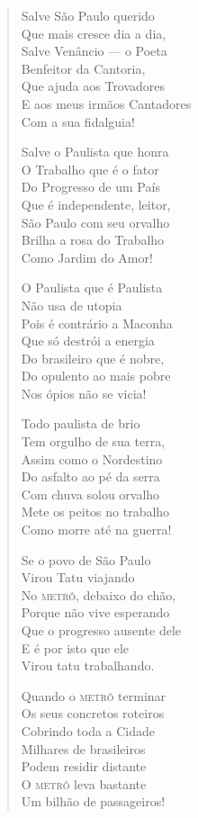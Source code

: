 \begin{verse}
Salve São Paulo querido \\
Que mais cresce dia a dia, \\
Salve Venâncio ---  o Poeta \\
Benfeitor da Cantoria, \\
Que ajuda aos Trovadores \\
E aos meus irmãos Cantadores \\
Com a sua fidalguia! 


Salve o Paulista que honra \\
O Trabalho que é o fator \\
Do Progresso de um País \\
Que é independente, leitor, \\
São Paulo com seu orvalho \\
Brilha a rosa do Trabalho \\
Como Jardim do Amor! 

O Paulista que é Paulista \\
Não usa de utopia \\
Pois é contrário a Maconha \\
Que só destrói a energia \\
Do brasileiro que é nobre, \\
Do opulento ao mais pobre \\
Nos ópios não se vicia! 

Todo paulista de brio \\
Tem orgulho de sua terra, \\
Assim como o Nordestino \\
Do asfalto ao pé da serra \\
Com chuva solou orvalho \\
Mete os peitos no trabalho \\
Como morre até na guerra! 

Se o povo de São Paulo \\
Virou Tatu viajando \\
No \textsc{metrô}, debaixo do chão, \\
Porque não vive esperando \\
Que o progresso ausente dele \\
E é por isto que ele \\
Virou tatu trabalhando. 


Quando o \textsc{metrô} terminar \\
Os seus concretos roteiros \\
Cobrindo toda a Cidade \\
Milhares de brasileiros \\
Podem residir distante \\
O \textsc{metrô} leva bastante \\
Um bilhão de passageiros! 


\end{verse}
